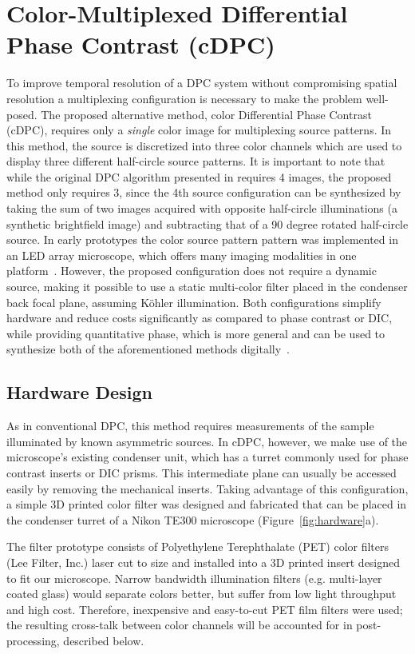 \section{Color-Multiplexed Differential Phase Contrast (cDPC) }
To improve temporal resolution of a DPC system without compromising spatial resolution a multiplexing configuration is necessary to make the problem well-posed. The proposed alternative method, color Differential Phase Contrast (cDPC), requires only a \emph{single} color image for multiplexing source patterns. In this method, the source is discretized into three color channels which are used to display three different half-circle source patterns. It is important to note that while the original DPC algorithm presented in \cite{tian2015quantitative} requires 4 images, the proposed method only requires 3, since the 4th source configuration can be synthesized by taking the sum of two images acquired with opposite half-circle illuminations (a synthetic brightfield image) and subtracting that of a 90 degree rotated half-circle source. In early prototypes the color source pattern pattern was implemented in an LED array microscope, which offers many imaging modalities in one platform~\cite{Tian14,zijiMulti,tian2015quantitative,Ma:15,Phillips15, Zheng2011, Zheng2013}. However, the proposed configuration does not require a dynamic source, making it possible to use a static multi-color filter placed in the condenser back focal plane, assuming K\"{o}hler illumination. Both configurations simplify hardware and reduce costs significantly as compared to phase contrast or DIC, while providing quantitative phase, which is more general and can be used to synthesize both of the aforementioned methods digitally~\cite{JMI:JMI1027}.

\subsection{Hardware Design}
As in conventional DPC, this method requires measurements of the sample illuminated by known asymmetric sources. In cDPC, however, we make use of the microscope's existing condenser unit, which has a turret commonly used for phase contrast inserts or DIC prisms. This intermediate plane can usually be accessed easily by removing the mechanical inserts. Taking advantage of this configuration, a simple 3D printed color filter was designed and fabricated that can be placed in the condenser turret of a Nikon TE300 microscope (Figure~\ref{fig:hardware}a).

The filter prototype consists of Polyethylene Terephthalate (PET) color filters (Lee Filter, Inc.) laser cut to size and installed into a 3D printed insert designed to fit our microscope. Narrow bandwidth illumination filters (e.g. multi-layer coated glass) would separate colors better, but suffer from low light throughput and high cost. Therefore, inexpensive and easy-to-cut PET film filters were used; the resulting cross-talk between color channels will be accounted for in post-processing, described below.

